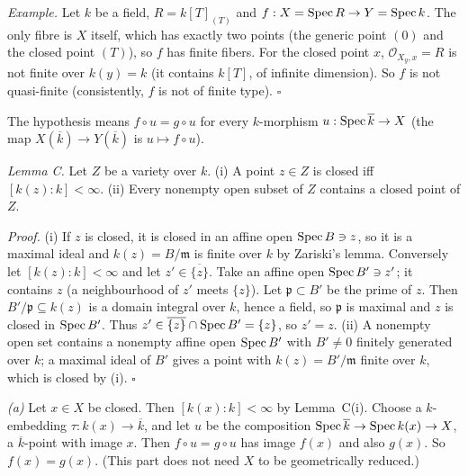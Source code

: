 \documentclass[11pt]{article}
\begin{document}
\emph{Example.} Let $k$ be a field, $R=k[T]_{(T)}$ and $f:X=\operatorname{Spec} R\to Y=\operatorname{Spec} k$. The only fibre is $X$ itself, which has exactly two points (the generic point $(0)$ and the closed point $(T)$), so $f$ has finite fibers. For the closed point $x$, $\mathcal O_{X_y,x}=R$ is not finite over $k(y)=k$ (it contains $k[T]$, of infinite dimension). So $f$ is not quasi-finite (consistently, $f$ is not of finite type). \hfill$\square$

\pf
The hypothesis means $f\circ u=g\circ u$ for every $k$-morphism $u:\operatorname{Spec}\overline k\to X$ (the map $X(\overline k)\to Y(\overline k)$ is $u\mapsto f\circ u$).

\emph{Lemma C.} Let $Z$ be a variety over $k$. (i) A point $z\in Z$ is closed iff $[k(z):k]<\infty$. (ii) Every nonempty open subset of $Z$ contains a closed point of $Z$.

\emph{Proof.} (i) If $z$ is closed, it is closed in an affine open $\operatorname{Spec} B\ni z$, so it is a maximal ideal and $k(z)=B/\mathfrak m$ is finite over $k$ by Zariski's lemma. Conversely let $[k(z):k]<\infty$ and let $z'\in\overline{\{z\}}$. Take an affine open $\operatorname{Spec} B'\ni z'$; it contains $z$ (a neighbourhood of $z'$ meets $\{z\}$). Let $\mathfrak p\subset B'$ be the prime of $z$. Then $B'/\mathfrak p\subseteq k(z)$ is a domain integral over $k$, hence a field, so $\mathfrak p$ is maximal and $z$ is closed in $\operatorname{Spec} B'$. Thus $z'\in\overline{\{z\}}\cap\operatorname{Spec} B'=\{z\}$, so $z'=z$. (ii) A nonempty open set contains a nonempty affine open $\operatorname{Spec} B'$ with $B'\neq0$ finitely generated over $k$; a maximal ideal of $B'$ gives a point with $k(z)=B'/\mathfrak m$ finite over $k$, which is closed by (i). \hfill$\square$

\emph{(a)} Let $x\in X$ be closed. Then $[k(x):k]<\infty$ by Lemma~C(i). Choose a $k$-embedding $\tau:k(x)\to\overline k$, and let $u$ be the composition $\operatorname{Spec}\overline k\to\operatorname{Spec} k(x)\to X$, a $\overline k$-point with image $x$. Then $f\circ u=g\circ u$ has image $f(x)$ and also $g(x)$. So $f(x)=g(x)$. (This part does not need $X$ to be geometrically reduced.)
\end{document}

